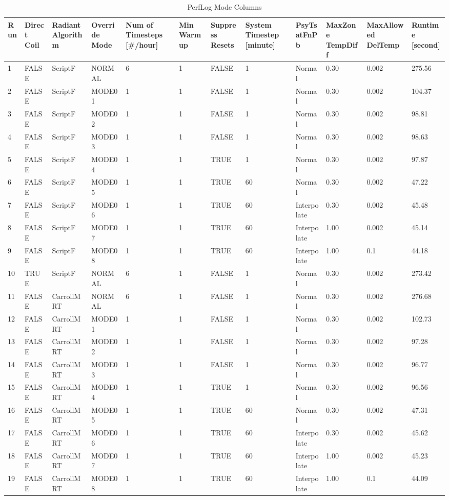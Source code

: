         {\scriptsize
\begin{longtable}[c]{p{0.15in}p{0.4in}p{0.55in}p{0.5in}p{0.52in}p{0.4in}p{0.5in}p{0.5in}p{0.55in}p{0.5in}p{0.55in}p{0.5in}}
    \caption{PerfLog Mode Columns\label{table:perflog_mode_columns}} \tabularnewline
    \toprule
    Run &
    Direct Coil &
    Radiant Algorithm &
    Override Mode &
    Num of Timesteps {[}\#/hour{]}&
    Min Warmup&
    Suppress Resets &
    System Timestep {[}minute{]} &
    PsyTsatFnPb &
    MaxZone TempDiff &
    MaxAllowed DelTemp &
    Runtime {[}second{]} \tabularnewline
    \midrule
    \endfirsthead

    1  & FALSE & ScriptF    & NORMAL & 6 & 1 & FALSE & 1 & Normal & 0.30 & 0.002 & 275.56 \tabularnewline
    2  & FALSE & ScriptF    & MODE01 & 1 & 1 & FALSE & 1 & Normal & 0.30 & 0.002 & 104.37 \tabularnewline
    3  & FALSE & ScriptF    & MODE02 & 1 & 1 & FALSE & 1 & Normal & 0.30 & 0.002 & 98.81  \tabularnewline
    4  & FALSE & ScriptF    & MODE03 & 1 & 1 & FALSE & 1 & Normal & 0.30 & 0.002 & 98.63 \tabularnewline
    5  & FALSE & ScriptF    & MODE04 & 1 & 1 & TRUE  & 1 & Normal & 0.30 & 0.002 & 97.87  \tabularnewline
    6  & FALSE & ScriptF    & MODE05 & 1 & 1 & TRUE  & 60 & Normal & 0.30 & 0.002 & 47.22  \tabularnewline
    7  & FALSE & ScriptF    & MODE06 & 1 & 1 & TRUE  & 60 & Interpolate & 0.30 & 0.002 & 45.48 \tabularnewline
    8  & FALSE & ScriptF    & MODE07 & 1 & 1 & TRUE  & 60 & Interpolate & 1.00 & 0.002 & 45.14  \tabularnewline
    9  & FALSE & ScriptF    & MODE08 & 1 & 1 & TRUE  & 60 & Interpolate & 1.00 & 0.1   & 44.18  \tabularnewline
    10 & TRUE  & ScriptF    & NORMAL & 6 & 1 & FALSE & 1 & Normal & 0.30 & 0.002 & 273.42 \tabularnewline
    11 & FALSE & CarrollMRT & NORMAL & 6 & 1 & FALSE & 1 & Normal & 0.30 & 0.002 & 276.68 \tabularnewline
    12 & FALSE & CarrollMRT & MODE01 & 1 & 1 & FALSE & 1 & Normal & 0.30 & 0.002 & 102.73  \tabularnewline
    13 & FALSE & CarrollMRT & MODE02 & 1 & 1 & FALSE & 1 & Normal & 0.30 & 0.002 & 97.28  \tabularnewline
    14 & FALSE & CarrollMRT & MODE03 & 1 & 1 & FALSE & 1  & Normal & 0.30 & 0.002 & 96.77 \tabularnewline
    15 & FALSE & CarrollMRT & MODE04 & 1 & 1 & TRUE  & 1  & Normal & 0.30 & 0.002 & 96.56  \tabularnewline
    16 & FALSE & CarrollMRT & MODE05 & 1 & 1 & TRUE  & 60 & Normal & 0.30 & 0.002 & 47.31  \tabularnewline
    17 & FALSE & CarrollMRT & MODE06 & 1 & 1 & TRUE  & 60 & Interpolate & 0.30 & 0.002 & 45.62  \tabularnewline
    18 & FALSE & CarrollMRT & MODE07 & 1 & 1 & TRUE  & 60 & Interpolate & 1.00 & 0.002 & 45.23  \tabularnewline
    19 & FALSE & CarrollMRT & MODE08 & 1 & 1 & TRUE  & 60 & Interpolate & 1.00 & 0.1   & 44.09  \tabularnewline

    \bottomrule
\end{longtable}
}

